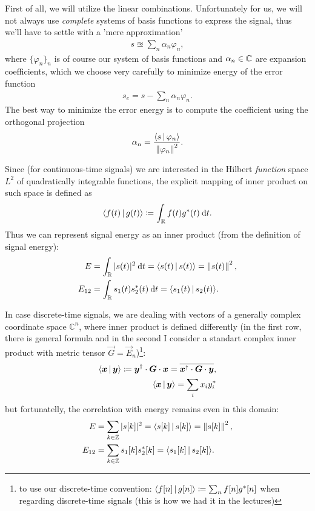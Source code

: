 \documentclass[11pt,a4paper]{report}
\theoremstyle{remark}
\theoremstyle{definition}
\begin{document}
				First of all, we will utilize the linear combinations. Unfortunately for us, we will not always use \textit{complete} systems of basis functions to express the signal, thus we'll have to settle with a 'mere approximation'
				\begin{align}
					\label{eq:sigexpansion}
					s \approxeq \sum_n \alpha_n \varphi_n,
				\end{align}
				where $\{ \varphi_n \}_n$ is of course our system of basis functions and $\alpha_n \in {\mathbb C}$ are expansion coefficients, which we choose very carefully to minimize energy of the error function
				\begin{align}
					s_e = s - \sum_n \alpha_n \varphi_n.
				\end{align}
				The best way to minimize the error energy is to compute the coefficient using the orthogonal projection
				\begin{align}
					\label{eq:signalorthogonalprojection}
					\alpha_n = \frac{\langle s\,|\,\varphi_n\rangle}{\left\lVert\varphi_n\right\rVert^2}.
				\end{align}
				
				Since (for continuous-time signals) we are interested in the Hilbert \textit{function} space $L^2$ of quadratically integrable functions, the explicit mapping of inner product on such space is defined as
				\begin{align}
					\langle f(t)\,|\,g(t)\rangle \coloneqq \int_{\mathbb R} f(t) g^*(t) \: {\mathrm d} t.
				\end{align}
				Thus we can represent signal energy as an inner product (from the definition of signal energy):
				\begin{align}
					\label{eq:innerproductenergy}
					E &= \int_{\mathbb R} |s(t)|^2 \: {\mathrm d} t = \langle s(t)\,|\,s(t)\rangle = \left\lVert s(t)\right\rVert^2,
				\\
					\label{eq:innerproductmutualtenergy}
					E_{12} &= \int_{\mathbb R} s_1(t) s_2^*(t) \: {\mathrm d} t = \langle s_1(t)\,|\,s_2(t)\rangle.
				\end{align}
				
				In case discrete-time signals, we are dealing with vectors of a generally complex coordinate space $\mathbb C^n$, where inner product is defined differently (in the first row, there is general formula and in the second I consider a standart complex inner product with metric tensor $\vec G = \vec E_n$)\footnote{to use our discrete-time convention: $\langle f[n]\,|\,g[n]\rangle \coloneqq  \sum_{n} f[n] g^*[n]$ when regarding discrete-time signals (this is how we had it in the lectures)}:
				\begin{align}
					\langle\boldsymbol x\,|\,\boldsymbol y\rangle \coloneqq \boldsymbol y^\dagger \cdot \boldsymbol G \cdot \boldsymbol x = \overline{\boldsymbol x^\dagger \cdot \boldsymbol G \cdot \boldsymbol y},
				\\
					\langle\boldsymbol x\,|\,\boldsymbol y\rangle = \sum_{i} x_i y_i^*
				\end{align}
				but fortunatelly, the correlation with energy remains even in this domain:
				\begin{align}
					E &= \sum_{k \in {\mathbb Z}} |s[k]|^2 = \langle s[k]\,|\,s[k]\rangle = \left\lVert s[k]\right\rVert^2,
				\\
					E_{12} &= \sum_{k \in {\mathbb Z}} s_1[k] s_2^*[k] = \langle s_1[k]\,|\,s_2[k]\rangle.
				\end{align}
				
\end{document}
